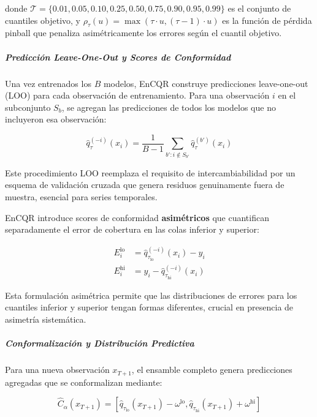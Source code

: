 donde $\mathcal{T} = \{0.01, 0.05, 0.10, 0.25, 0.50, 0.75, 0.90, 0.95, 0.99\}$ es el conjunto de cuantiles objetivo, y $\rho_{\tau}(u) = \max(\tau \cdot u, (\tau - 1) \cdot u)$ es la función de pérdida pinball que penaliza asimétricamente los errores según el cuantil objetivo.

\subparagraph{Predicción Leave-One-Out y Scores de Conformidad}

Una vez entrenados los $B$ modelos, EnCQR construye predicciones leave-one-out (LOO) para cada observación de entrenamiento. Para una observación $i$ en el subconjunto $S_b$, se agregan las predicciones de todos los modelos que no incluyeron esa observación:

\begin{equation}
\hat{q}_{\tau}^{(-i)}(x_i) = \frac{1}{B-1}\sum_{b': i \notin S_{b'}} \hat{q}_{\tau}^{(b')}(x_i)
\end{equation}

Este procedimiento LOO reemplaza el requisito de intercambiabilidad por un esquema de validación cruzada que genera residuos genuinamente fuera de muestra, esencial para series temporales.

EnCQR introduce scores de conformidad \textbf{asimétricos} que cuantifican separadamente el error de cobertura en las colas inferior y superior:

\begin{equation}
\begin{aligned}
E_i^{\text{lo}} &= \hat{q}_{\tau_{\text{lo}}}^{(-i)}(x_i) - y_i \\
E_i^{\text{hi}} &= y_i - \hat{q}_{\tau_{\text{hi}}}^{(-i)}(x_i)
\end{aligned}
\end{equation}

Esta formulación asimétrica permite que las distribuciones de errores para los cuantiles inferior y superior tengan formas diferentes, crucial en presencia de asimetría sistemática.

\subparagraph{Conformalización y Distribución Predictiva}

Para una nueva observación $x_{T+1}$, el ensamble completo genera predicciones agregadas que se conformalizan mediante:

\begin{equation}
\hat{C}_{\alpha}(x_{T+1}) = \left[\hat{q}_{\tau_{\text{lo}}}(x_{T+1}) - \omega^{\text{lo}}, \hat{q}_{\tau_{\text{hi}}}(x_{T+1}) + \omega^{\text{hi}}\right]
\end{equation}

